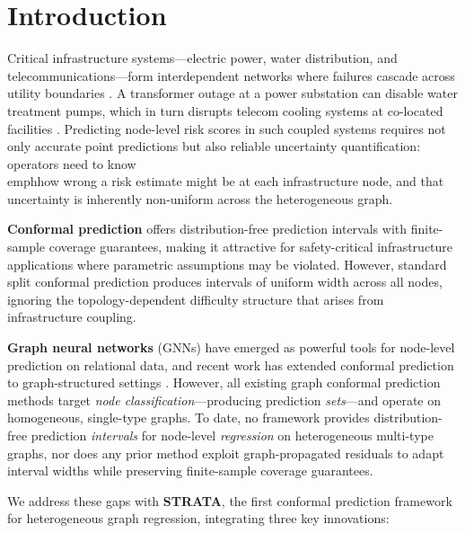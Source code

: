 \documentclass[twoside,11pt]{article}
\begin{document}
\section{Introduction}
\label{sec:intro}

Critical infrastructure systems---electric power, water distribution,
and telecommunications---form interdependent networks where failures
cascade across utility boundaries
\citep{rinaldi2001identifying,buldyrev2010catastrophic}.
A transformer outage at a power substation can disable water treatment
pumps, which in turn disrupts telecom cooling systems at co-located
facilities \citep{ouyang2014review}. Predicting node-level risk scores
in such coupled systems requires not only accurate point predictions
but also reliable uncertainty quantification: operators need to know
\\emph{how wrong} a risk estimate might be at each infrastructure
node, and that uncertainty is inherently non-uniform across the
heterogeneous graph.

\textbf{Conformal prediction} \citep{vovk2005algorithmic,shafer2008tutorial,
angelopoulos2023conformal} offers distribution-free prediction intervals with
finite-sample coverage guarantees, making it attractive for safety-critical
infrastructure applications where parametric assumptions may be violated.
However, standard split conformal prediction produces intervals of uniform
width across all nodes, ignoring the topology-dependent difficulty structure
that arises from infrastructure coupling.

\textbf{Graph neural networks} (GNNs) \citep{kipf2017semi,gilmer2017neural,
hamilton2017inductive} have emerged as powerful tools for node-level prediction
on relational data, and recent work has extended conformal prediction to
graph-structured settings \citep{zargarbashi2023conformal,huang2024uncertainty,
clarkson2023distribution}. However, all existing graph conformal prediction
methods target \emph{node classification}---producing prediction
\emph{sets}---and operate on homogeneous, single-type graphs.
To date, no framework provides distribution-free prediction
\emph{intervals} for node-level \emph{regression} on heterogeneous
multi-type graphs, nor does any prior method exploit graph-propagated
residuals to adapt interval widths while preserving finite-sample coverage
guarantees.

We address these gaps with \textbf{STRATA}, the first conformal prediction
framework for heterogeneous graph regression, integrating
three key innovations:
\end{document}
